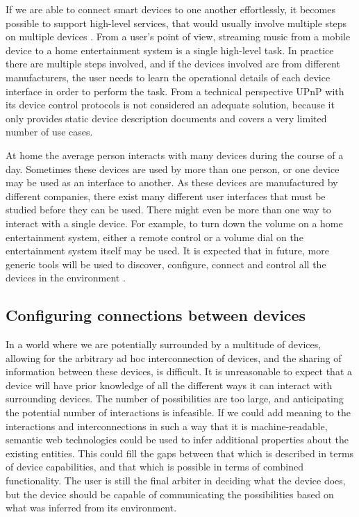 If we are able to connect smart devices to one another effortlessly, it becomes possible to support high-level services, that would usually involve multiple steps on multiple devices \cite{Rich2009}. From a user's point of view, streaming music from a mobile device to a home entertainment system is a single high-level task. In practice there are multiple steps involved, and if the devices involved are from different manufacturers, the user needs to learn the operational details of each device interface in order to perform the task. From a technical perspective \ac{UPnP} with its device control protocols \cite{uPnPDCP} is not considered an adequate solution, because it only provides static device description documents and covers a very limited number of use cases. %

At home the average person interacts with many devices during the course of a day. Sometimes these devices are used by more than one person, or one device may be used as an interface to another. As these devices are manufactured by different companies, there exist many different user interfaces that must be studied before they can be used. There might even be more than one way to interact with a single device. For example, to turn down the volume on a home entertainment system, either a remote control or a volume dial on the entertainment system itself may be used. It is expected that in future, more generic tools will be used to discover, configure, connect and control all the devices in the environment \cite{Newman2002}. 

\subsection{Configuring connections between devices}

In a world where we are potentially surrounded by a multitude of devices, allowing for the arbitrary ad hoc interconnection of devices, and the sharing of information between these devices, is difficult. It is unreasonable to expect that a device will have prior knowledge of all the different ways it can interact with surrounding devices. The number of possibilities are too large, and anticipating the potential number of interactions is infeasible. If we could add meaning to the interactions and interconnections in such a way that it is machine-readable, semantic web technologies could be used to infer additional properties about the existing entities. This could fill the gaps between that which is described in terms of device capabilities, and that which is possible in terms of combined functionality. The user is still the final arbiter in deciding what the device does, but the device should be capable of communicating the possibilities based on what was inferred from its environment. 


